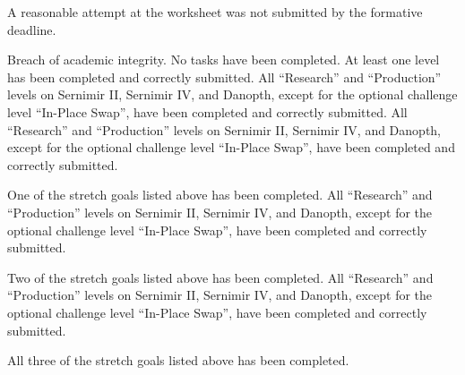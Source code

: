\documentclass{../../../fal_assignment}
\begin{document}
\begin{markingrubric}
        \grade\fail	A reasonable attempt at the worksheet was not submitted by the formative deadline.
        \par Breach of academic integrity.
        \grade\fail No tasks have been completed.
        \grade At least one level has been completed and correctly submitted.
        \grade All ``Research'' and ``Production'' levels on Sernimir II, Sernimir IV, and Danopth, except for the optional challenge level ``In-Place Swap'', have been completed and correctly submitted.
        \grade All ``Research'' and ``Production'' levels on Sernimir II, Sernimir IV, and Danopth, except for the optional challenge level ``In-Place Swap'', have been completed and correctly submitted.
            \par One of the stretch goals listed above has been completed.
        \grade All ``Research'' and ``Production'' levels on Sernimir II, Sernimir IV, and Danopth, except for the optional challenge level ``In-Place Swap'', have been completed and correctly submitted.
            \par Two of the stretch goals listed above has been completed.
        \grade All ``Research'' and ``Production'' levels on Sernimir II, Sernimir IV, and Danopth, except for the optional challenge level ``In-Place Swap'', have been completed and correctly submitted.
            \par All three of the stretch goals listed above has been completed.
\end{markingrubric}
\end{document}

